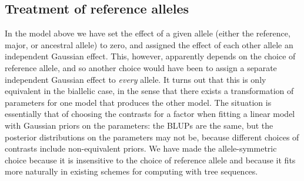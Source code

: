 
\subsection{Treatment of reference alleles}
\label{sec:reference_alleles}

In the model above we have set the effect of a given allele
(either the reference, major, or ancestral allele) to zero,
and assigned the effect of each other allele an independent Gaussian effect.
This, however, apparently depends on the choice of reference allele,
and so another choice would have been
to assign a separate independent Gaussian effect to \emph{every} allele.
It turns out that this is only equivalent in the biallelic case,
in the sense that there exists a transformation of parameters for one model
that produces the other model.
The situation is essentially that of choosing the contrasts for a factor
when fitting a linear model with Gaussian priors on the parameters:
the BLUPs are the same, but the posterior distributions on the parameters may not be,
because different choices of contrasts include non-equivalent priors.
We have made the allele-symmetric choice
because it is insensitive to the choice of reference allele
and because it fits more naturally in existing schemes for computing with tree sequences.

